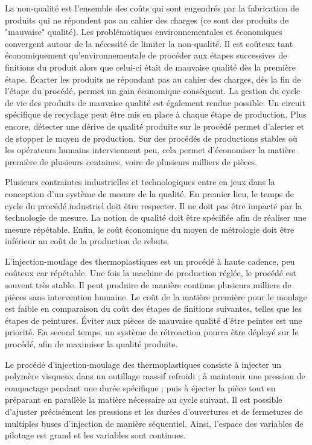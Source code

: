La non-qualité est l'ensemble des coûts qui sont engendrés par la fabrication de produits qui ne répondent pas au cahier des charges (ce sont des produits de "mauvaise" qualité).
Les problématiques environnementales et économiques convergent autour de la nécessité de limiter la non-qualité.
Il est coûteux tant économiquement qu'environnementale de procéder aux étapes successives de finitions du produit alors que celui-ci était de mauvaise qualité dès la première étape.
Écarter les produits ne répondant pas au cahier des charges, dès la fin de l'étape du procédé, permet un gain économique conséquent.
La gestion du cycle de vie des produits de mauvaise qualité est également rendue possible.
Un circuit spécifique de recyclage peut être mis en place à chaque étape de production.
Plus encore, détecter une dérive de qualité produite sur le procédé permet d'alerter et de stopper le moyen de production.
Sur des procédés de productions stables où les opérateurs humains interviennent peu, cela permet d'économiser la matière première de plusieurs centaines, voire de plusieurs milliers de pièces.

Plusieurs contraintes industrielles et technologiques entre en jeux dans la conception d'un système de mesure de la qualité.
En premier lieu, le temps de cycle du procédé industriel doit être respecter. Il ne doit pas être impacté par la technologie de mesure.
La notion de qualité doit être spécifiée afin de réaliser une mesure répétable.
Enfin, le coût économique du moyen de métrologie doit être inférieur au coût de la production de rebuts. 

L'injection-moulage des thermoplastiques est un procédé à haute cadence, peu coûteux car répétable.
Une fois la machine de production réglée, le procédé est souvent très stable.
Il peut produire de manière continue plusieurs milliers de pièces sans intervention humaine.
Le coût de la matière première pour le moulage est faible en comparaison du coût des étapes de finitions suivantes, telles que les étapes de peintures.
Éviter aux pièces de mauvaise qualité d'être peintes est une priorité.
En second temps, un système de rétroaction pourra être déployé sur le procédé, afin de maximiser la qualité produite.

Le procédé d'injection-moulage des thermoplastiques consiste à injecter un polymère visqueux dans un outillage massif refroidi ; à maintenir une pression de compactage pendant une durée spécifique ; puis à éjecter la pièce tout en préparant en parallèle la matière nécessaire au cycle suivant.
Il est possible d'ajuster précisément les pressions et les durées d'ouvertures et de fermetures de multiples buses d'injection de manière séquentiel.
Ainsi, l'espace des variables de pilotage est grand et les variables sont continues.


